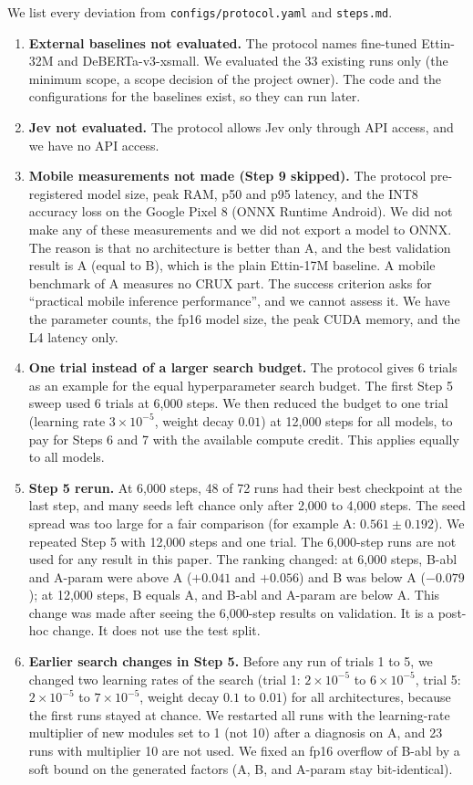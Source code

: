 \documentclass[11pt,a4paper]{article}
\begin{document}
We list every deviation from \texttt{configs/protocol.yaml} and \texttt{steps.md}.
\begin{enumerate}
  \item \textbf{External baselines not evaluated.} The protocol names fine-tuned Ettin-32M and DeBERTa-v3-xsmall. We evaluated the 33 existing runs only (the minimum scope, a scope decision of the project owner). The code and the configurations for the baselines exist, so they can run later.
  \item \textbf{Jev not evaluated.} The protocol allows Jev only through API access, and we have no API access.
  \item \textbf{Mobile measurements not made (Step 9 skipped).} The protocol pre-registered model size, peak RAM, p50 and p95 latency, and the INT8 accuracy loss on the Google Pixel 8 (ONNX Runtime Android). We did not make any of these measurements and we did not export a model to ONNX. The reason is that no architecture is better than A, and the best validation result is A (equal to B), which is the plain Ettin-17M baseline. A mobile benchmark of A measures no CRUX part. The success criterion asks for ``practical mobile inference performance'', and we cannot assess it. We have the parameter counts, the fp16 model size, the peak CUDA memory, and the L4 latency only.
  \item \textbf{One trial instead of a larger search budget.} The protocol gives 6 trials as an example for the equal hyperparameter search budget. The first Step 5 sweep used 6 trials at 6{,}000 steps. We then reduced the budget to one trial (learning rate $3\times10^{-5}$, weight decay $0.01$) at 12{,}000 steps for all models, to pay for Steps 6 and 7 with the available compute credit. This applies equally to all models.
  \item \textbf{Step 5 rerun.} At 6{,}000 steps, 48 of 72 runs had their best checkpoint at the last step, and many seeds left chance only after 2{,}000 to 4{,}000 steps. The seed spread was too large for a fair comparison (for example A: $0.561 \pm 0.192$). We repeated Step 5 with 12{,}000 steps and one trial. The 6{,}000-step runs are not used for any result in this paper. The ranking changed: at 6{,}000 steps, B-abl and A-param were above A ($+0.041$ and $+0.056$) and B was below A ($-0.079$); at 12{,}000 steps, B equals A, and B-abl and A-param are below A. This change was made after seeing the 6{,}000-step results on validation. It is a post-hoc change. It does not use the test split.
  \item \textbf{Earlier search changes in Step 5.} Before any run of trials 1 to 5, we changed two learning rates of the search (trial 1: $2\times10^{-5}$ to $6\times10^{-5}$, trial 5: $2\times10^{-5}$ to $7\times10^{-5}$, weight decay $0.1$ to $0.01$) for all architectures, because the first runs stayed at chance. We restarted all runs with the learning-rate multiplier of new modules set to 1 (not 10) after a diagnosis on A, and 23 runs with multiplier 10 are not used. We fixed an fp16 overflow of B-abl by a soft bound on the generated factors (A, B, and A-param stay bit-identical).

\end{enumerate}
\end{document}
